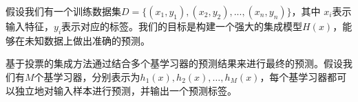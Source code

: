 \documentclass{SCIA2018cn}
\theoremstyle{mystyle}
\begin{document}
假设我们有一个训练数据集$D=\{(x_1,y_1),(x_2,y_2),...,(x_n,y_n)\}$，其中
$x_i$表示输入特征，$y_i$表示对应的标签。我们的目标是构建一个强大的集成模型$H(x)$，能够在未知数据上做出准确的预测。

基于投票的集成方法通过结合多个基学习器的预测结果来进行最终的预测。假设我们有$M$个基学习器，分别表示为$h_1(x),h_2(x),\dots,h_M(x)$，每个基学习器都可以独立地对输入样本进行预测，并输出一个预测标签。










 
\makeentitle
 
 
\end{document}
